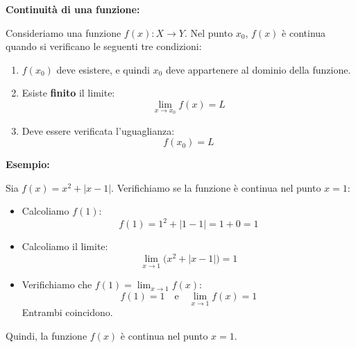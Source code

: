 \documentclass[12pt]{article}
\begin{document}
\Huge

\textbf{Continuità di una funzione:}  

Consideriamo una funzione \( f(x): X \to Y \).  
Nel punto \( x_0 \), \( f(x) \) è continua quando si verificano le seguenti tre condizioni:  

\begin{enumerate}
    \item \( f(x_0) \) deve esistere, e quindi \( x_0 \) deve appartenere al dominio della funzione.
    \item Esiste \textbf{finito} il limite:  
    \[
    \lim_{x \to x_0} f(x) = L
    \]
    \item Deve essere verificata l'uguaglianza:  
    \[
    f(x_0) = L
    \]
\end{enumerate}

\vspace{0.5cm}

\textbf{Esempio:}  

Sia \( f(x) = x^2 + |x - 1| \).  
Verifichiamo se la funzione è continua nel punto \( x = 1 \):  

\begin{itemize}
    \item Calcoliamo \( f(1) \):  
    \[
    f(1) = 1^2 + |1 - 1| = 1 + 0 = 1
    \]

    \item Calcoliamo il limite:  
    \[
    \lim_{x \to 1} \big(x^2 + |x - 1|\big) = 1
    \]

    \item Verifichiamo che \( f(1) = \lim_{x \to 1} f(x) \):  
    \[
    f(1) = 1 \quad \text{e} \quad \lim_{x \to 1} f(x) = 1
    \]
    Entrambi coincidono.
\end{itemize}

\vspace{0.5cm}

Quindi, la funzione \( f(x) \) è continua nel punto \( x = 1 \).
\end{document}
